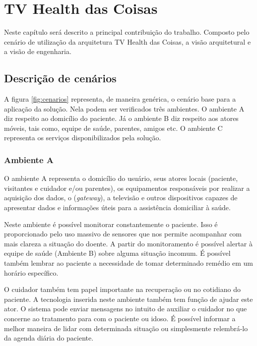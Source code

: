 \chapter{TV Health das Coisas}\label{cap:quatro}

Neste capítulo será descrito a principal contribuição do trabalho. Composto
pelo cenário de utilização da arquitetura TV Health das Coisas, a visão arquitetural 
e a visão de engenharia.

\section{Descrição de cenários}

A figura \ref{fig:cenarios} representa, de maneira genérica, o cenário base
para a aplicação da solução. Nela podem ser verificados três ambientes. O
ambiente A diz respeito ao domicílio do paciente. Já o ambiente B diz respeito
aos atores móveis, tais como, equipe de saúde, parentes, amigos etc. O ambiente
C representa os serviços disponibilizados pela solução.


\subsection{Ambiente A} \label{subsec:ambiente-a}

O ambiente A representa o domicílio do usuário, seus atores locais (paciente,
visitantes e cuidador e/ou parentes), os equipamentos responsáveis por  realizar
a aquisição dos dados, o \stb[] (\textit{gateway}), a televisão e outros
dispositivos capazes de apresentar dados e informações úteis para a assistência
domiciliar à saúde.

Neste ambiente é possível monitorar constantemente o paciente. Isso é 
proporcionado pelo uso massivo de sensores que nos permite acompanhar com mais clareza 
a situação do doente. A partir do monitoramento é possível alertar à equipe
de saúde (Ambiente B) sobre alguma situação incomum. É possível 
também lembrar ao paciente a necessidade de tomar determinado remédio em um
horário específico.

O cuidador também tem papel importante na recuperação ou no cotidiano do 
paciente. A tecnologia inserida neste ambiente também tem função de ajudar
este ator. O sistema pode enviar mensagens no intuito de auxiliar o cuidador no
que concerne ao tratamento para com o paciente ou idoso. É possível informar 
a melhor maneira de lidar com determinada situação ou simplesmente relembrá-lo 
da agenda diária do paciente.

